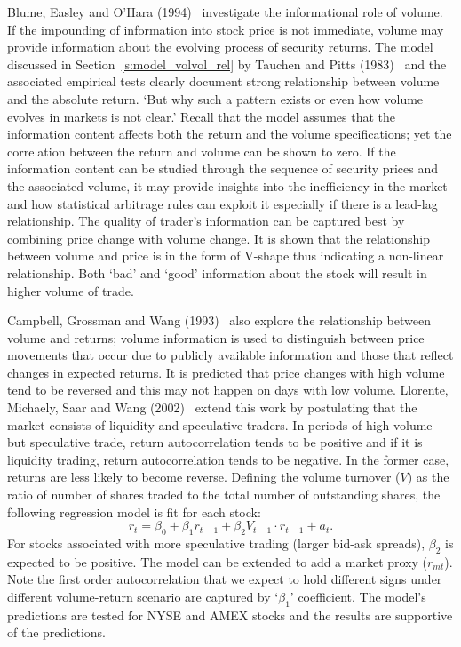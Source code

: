 Blume, Easley and O'Hara (1994)~\cite{blumeohar} investigate the informational role of volume. If the impounding of information into stock price is not immediate, volume may provide information about the evolving process of security returns. The model discussed in Section~\ref{s:model_volvol_rel} by Tauchen and Pitts (1983)~\cite{tauchenpitts} and the associated empirical tests clearly document strong relationship between volume and the absolute return. `But why such a pattern exists or even how volume evolves in markets is not clear.' Recall that the model assumes that the information content affects both the return and the volume specifications; yet the correlation between the return and volume can be shown to zero. If the information content can be studied through the sequence of security prices and the associated volume, it may provide insights into the inefficiency in the market and how statistical arbitrage rules can exploit it especially if there is a lead-lag relationship. The quality of trader's information can be captured best by combining price change with volume change. It is shown that the relationship between volume and price is in the form of V-shape thus indicating a non-linear relationship. Both `bad' and `good' information about the stock will result in higher volume of trade. 


Campbell, Grossman and Wang (1993)~\cite{campbellgross} also explore the relationship between volume and returns; volume information is used to distinguish between price movements that occur due to publicly available information and those that reflect changes in expected returns. It is predicted that price changes with high volume tend to be reversed and this may not happen on days with low volume. Llorente, Michaely, Saar and Wang (2002)~\cite{llmsw} extend this work by postulating that the market consists of liquidity and speculative traders. In periods of high volume but speculative trade, return autocorrelation tends to be positive and if it is liquidity trading, return autocorrelation tends to be negative. In the former case, returns are less likely to become reverse. Defining the volume turnover ($V$) as the ratio of number of shares traded to the total number of outstanding shares, the following regression model is fit for each stock:
	\begin{equation} \label{eqn:regxt}
	r_t= \beta_0 + \beta_1 r_{t-1} + \beta_2 V_{t-1} \cdot r_{t-1} + a_t.
	\end{equation}
For stocks associated with more speculative trading (larger bid-ask spreads), $\beta_2$ is expected to be positive. The model can be extended to add a market proxy ($r_{mt}$). Note the first order autocorrelation that we expect to hold different signs under different volume-return scenario are captured by `$\beta_1$' coefficient. The model's predictions are tested for NYSE and AMEX stocks and the results are supportive of the predictions. 


